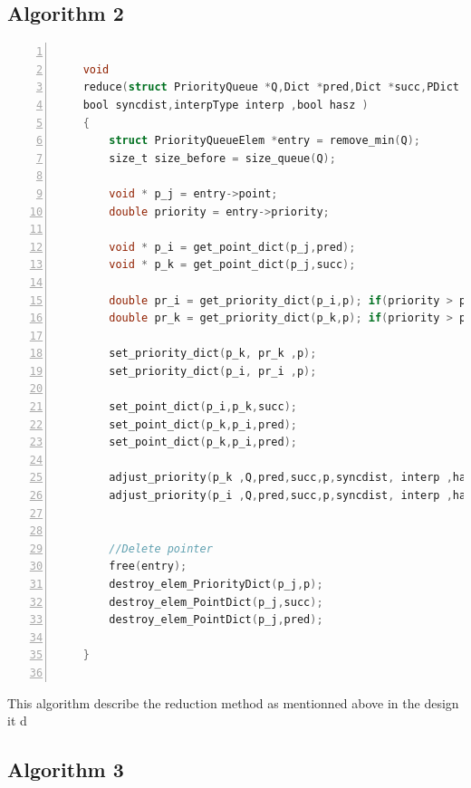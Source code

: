 \documentclass[twoside,12pt, a4paper]{report}
\begin{document}
\subsection{Algorithm 2}
\begin{lstlisting}[language=C, % Spécifie le langage du code
	caption={reduce}, % Légende du listing
	label=lst:reduce_c, % Étiquette pour référencer le listing
	numbers=left, 
	numberstyle=\tiny\color{gray}, 
	stepnumber=1, 
	frame=single,
	breaklines=true, 
	postbreak=\mbox{\textcolor{red}{$\hookrightarrow$}\space},
	showstringspaces=false 
	]
	
	void
	reduce(struct PriorityQueue *Q,Dict *pred,Dict *succ,PDict  *p,
	bool syncdist,interpType interp ,bool hasz )
	{
		struct PriorityQueueElem *entry = remove_min(Q);
		size_t size_before = size_queue(Q);
		
		void * p_j = entry->point;
		double priority = entry->priority;
		
		void * p_i = get_point_dict(p_j,pred);
		void * p_k = get_point_dict(p_j,succ);
		
		double pr_i = get_priority_dict(p_i,p); if(priority > pr_i){ pr_i = priority; }
		double pr_k = get_priority_dict(p_k,p); if(priority > pr_k){ pr_k = priority; }
		
		set_priority_dict(p_k, pr_k ,p);
		set_priority_dict(p_i, pr_i ,p);
		
		set_point_dict(p_i,p_k,succ);
		set_point_dict(p_k,p_i,pred);
		set_point_dict(p_k,p_i,pred);
		
		adjust_priority(p_k ,Q,pred,succ,p,syncdist, interp ,hasz );
		adjust_priority(p_i ,Q,pred,succ,p,syncdist, interp ,hasz );
		
		
		//Delete pointer
		free(entry);
		destroy_elem_PriorityDict(p_j,p);
		destroy_elem_PointDict(p_j,succ);
		destroy_elem_PointDict(p_j,pred);
		
	}
	
\end{lstlisting}

This algorithm describe the reduction method as mentionned above in the design it d	

\subsection{Algorithm 3}
\end{document}
